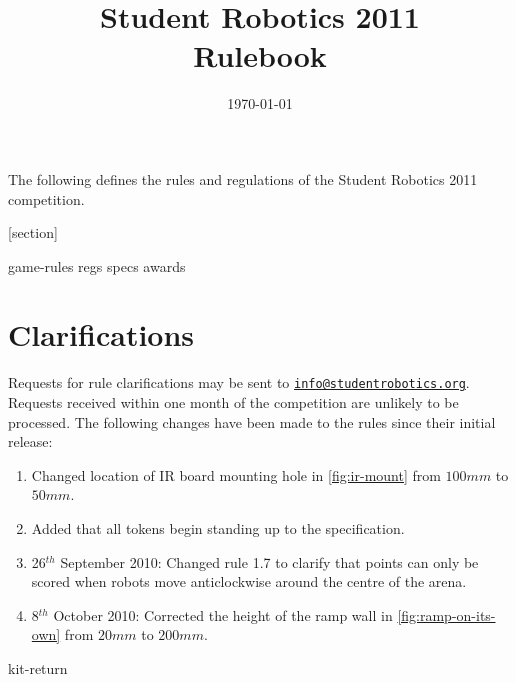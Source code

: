 \documentclass[a4paper, 12pt]{scrartcl}
\title {Student Robotics 2011\\ Rulebook}
\date{\today}
\begin{document}
\maketitle

\noindent The following defines the rules and regulations of the Student Robotics 2011 competition.

[section]
\newcommand{\rcn}{\stepcounter{rule}\arabic{section}.\arabic{rule}}
\renewcommand{\labelenumi}{\rcn}

 {game-rules}
\newpage
 {regs}
\newpage
 {specs}
\newpage
 {awards}

\renewcommand{\labelenumi}{\rcn}

\section{Clarifications}
Requests for rule clarifications may be sent to \href{mailto:info@studentrobotics.org}{\nolinkurl{info@studentrobotics.org}}.  Requests received within one month of the competition are unlikely to be processed.
The following changes have been made to the rules since their initial release:

\begin{enumerate}
\item Changed location of IR board mounting hole in \autoref{fig:ir-mount} from $100mm$ to $50mm$.
\item Added that all tokens begin standing up to the  specification.
\item 26$^{th}$ September 2010: Changed rule 1.7 to clarify that points can only be scored when robots move anticlockwise around the centre of the arena.
\item 8$^{th}$ October 2010: Corrected the height of the ramp wall in \autoref{fig:ramp-on-its-own} from $20mm$ to $200mm$.
\end{enumerate}

\newpage
\appendix
\appendixpage
\addappheadtotoc
 {kit-return}
\end{document}

